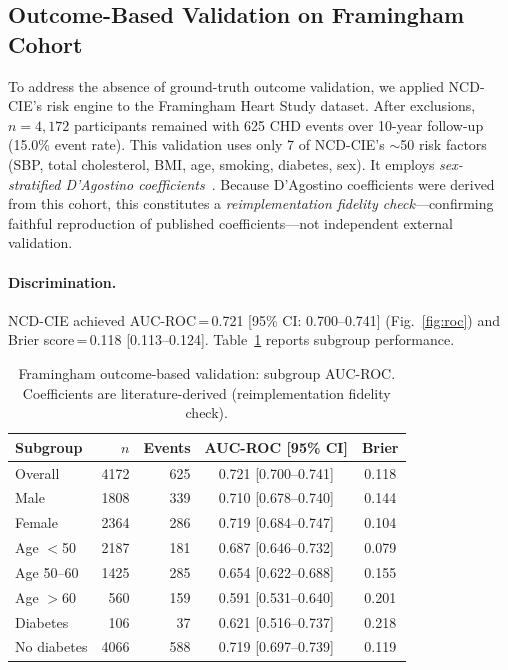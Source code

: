 \documentclass[runningheads]{llncs}
\begin{document}
\subsection{Outcome-Based Validation on Framingham Cohort}\label{sec:framingham}

To address the absence of ground-truth outcome validation, we applied
NCD-CIE's risk engine to the Framingham Heart Study dataset.
After exclusions, $n = 4{,}172$ participants remained with 625 CHD
events over 10-year follow-up (15.0\% event rate).
This validation uses only 7 of NCD-CIE's ${\sim}$50 risk factors
(SBP, total cholesterol, BMI, age, smoking, diabetes, sex).
It employs \emph{sex-stratified D'Agostino
coefficients}~\cite{dagostino2008}.
Because D'Agostino coefficients were derived from this cohort, this
constitutes a \emph{reimplementation fidelity check}---confirming
faithful reproduction of published coefficients---not independent
external validation.

\paragraph{Discrimination.}
NCD-CIE achieved AUC-ROC\,=\,0.721 [95\% CI: 0.700--0.741]
(Fig.~\ref{fig:roc}) and
Brier score\,=\,0.118 [0.113--0.124].
Table~\ref{tab:framingham_sub} reports subgroup performance.

\renewcommand{\arraystretch}{1.2}
\begin{table}[t]
\centering
\caption{Framingham outcome-based validation: subgroup AUC-ROC.
Coefficients are literature-derived (reimplementation fidelity check).}
\label{tab:framingham_sub}
\small
\begin{tabular}{@{}lrrcc@{}}
\toprule
\textbf{Subgroup} & \textbf{$n$} & \textbf{Events} & \textbf{AUC-ROC [95\% CI]} & \textbf{Brier} \\
\midrule
Overall     & 4172 & 625 & 0.721 [0.700--0.741] & 0.118 \\
Male        & 1808 & 339 & 0.710 [0.678--0.740] & 0.144 \\
Female      & 2364 & 286 & 0.719 [0.684--0.747] & 0.104 \\
Age ${<}$50 & 2187 & 181 & 0.687 [0.646--0.732] & 0.079 \\
Age 50--60  & 1425 & 285 & 0.654 [0.622--0.688] & 0.155 \\
Age ${>}$60 &  560 & 159 & 0.591 [0.531--0.640] & 0.201 \\
Diabetes    &  106 &  37 & 0.621 [0.516--0.737] & 0.218 \\
No diabetes & 4066 & 588 & 0.719 [0.697--0.739] & 0.119 \\
\bottomrule
\end{tabular}
\end{table}
\renewcommand{\arraystretch}{1.0}
\end{document}
